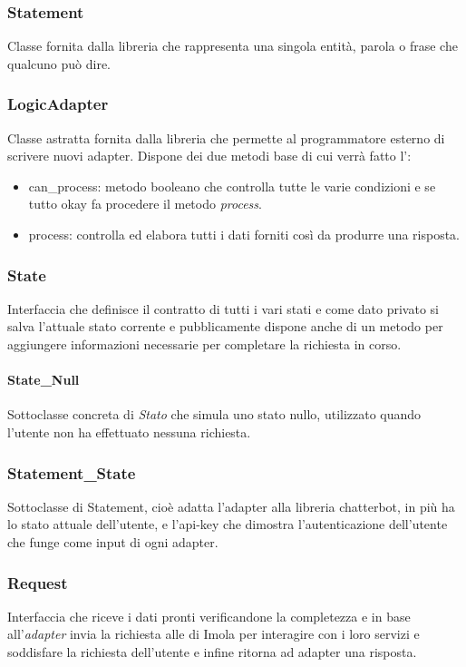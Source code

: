 \subsubsection{Statement} Classe fornita dalla libreria  che rappresenta una singola entità, parola o frase che qualcuno può dire.
\subsubsection{LogicAdapter} Classe astratta fornita dalla libreria  che permette al programmatore esterno di scrivere nuovi adapter. Dispone dei due metodi base di cui verrà fatto l':
    \begin{itemize}
        \item can\_process: metodo booleano che controlla tutte le varie condizioni e se tutto okay fa procedere il metodo \textit{process}.
        \item process: controlla ed elabora tutti i dati forniti così da produrre una risposta.
    \end{itemize}
\subsubsection{State} Interfaccia che definisce il contratto di tutti i vari stati e come dato privato si salva l'attuale stato corrente e pubblicamente dispone anche di un metodo per aggiungere informazioni necessarie per completare la richiesta in corso.
\paragraph*{State\_Null} Sottoclasse concreta di \textit{Stato} che simula uno stato nullo, utilizzato quando l'utente non ha effettuato nessuna richiesta.
\subsubsection{Statement\_State} Sottoclasse di Statement, cioè adatta l'adapter alla libreria chatterbot, in più ha lo stato attuale dell'utente, e l'api-key che dimostra l'autenticazione dell'utente che funge come input di ogni adapter.
\subsubsection{Request} Interfaccia che riceve i dati pronti verificandone la completezza e in base all'\textit{adapter} invia la richiesta  alle  di Imola per interagire con i loro servizi e soddisfare la richiesta dell'utente e infine ritorna ad adapter una risposta.

